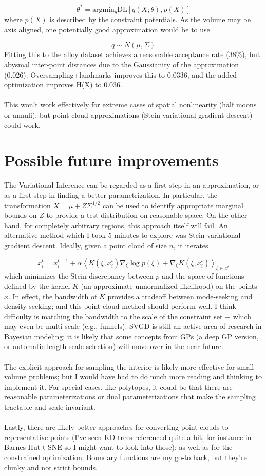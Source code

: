 \documentclass{article}
\begin{document}
$$\theta^* = \mathrm{argmin}_\theta \mathrm{DL}[q(X;\theta), p(X)]$$
where $p(X)$ is described by the constraint potentials. As the volume may be axis aligned, one potentially good approximation would be to use

$$ q \sim N(\mu, \Sigma) $$
Fitting this to the alloy dataset achieves a reasonable acceptance rate (38\%), but abysmal inter-point distances due to the Gaussianity of the approximation (0.026). Oversampling+landmarks improves this to 0.0336, and the added optimization improves H(X) to 0.036. \\ \\
This won't work effectively for extreme cases of spatial nonlinearity (half moons or annuli); but point-cloud approximations (Stein variational gradient descent) could work.

\section*{Possible future improvements}

The Variational Inference can be regarded as a first step in an approximation, or as a first step in finding a better parametrization. In particular, the transformation $X = \mu + Z\Sigma^{1/2}$ can be used to identify appropriate marginal bounds on $Z$ to provide a test distribution on reasonable space. On the other hand, for completely arbitrary regions, this approach itself will fail. An alternative method which I took 5 minutes to explore was Stein variational gradient descent. Ideally, given a point cloud of size $n$, it iterates 

$$x_i^t = x_i^{t-1} + \alpha \left\langle K(\xi, x_i^t)\nabla_\xi \log p(\xi) + \nabla_\xi K(\xi, x_i^t)\right\rangle_{\xi \in x^t}$$
which minimizes the Stein discrepancy between $p$ and the space of functions defined by the kernel $K$ (an approximate unnormalized likelihood) on the points $x$. In effect, the bandwidth of $K$ provides a tradeoff between mode-seeking and density seeking; and this point-cloud method should perform well. I think difficulty is matching the bandwidth to the scale of the constraint set $-$ which may even be multi-scale (e.g., funnels). SVGD is still an active area of research in Bayesian modeling; it is likely that some concepts from GPs (a deep GP version, or automatic length-scale selection) will move over in the near future. \\ \\
The explicit approach for sampling the interior is likely more effective for small-volume problems; but I would have had to do much more reading and thinking to implement it. For special cases, like polytopes, it could be that there are reasonable parameterizations or dual parameterizations that make the sampling tractable and scale invariant. \\ \\
Lastly, there are likely better approaches for converting point clouds to representative points (I've seen KD trees referenced quite a bit, for instance in Barnes-Hut t-SNE so I might want to look into those); as well as for the constrained optimization. Boundary functions are my go-to hack, but they're clunky and not strict bounds. 
\end{document}
